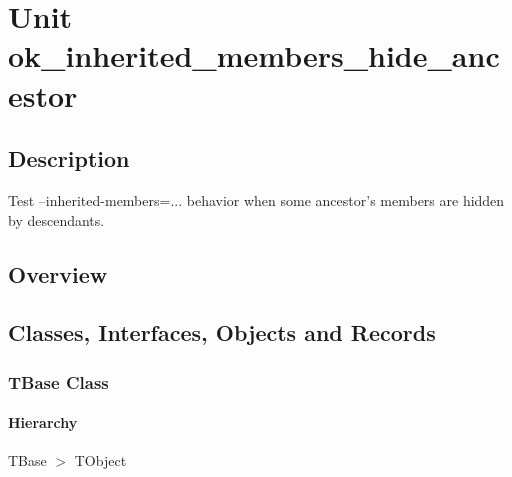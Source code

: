 \documentclass{report}
\newif\ifpdf
\begin{document}
\label{toc}\tableofcontents
\newpage
\newlength{\tmplength}
\chapter{Unit ok{\_}inherited{\_}members{\_}hide{\_}ancestor}
\label{ok_inherited_members_hide_ancestor}
\section{Description}
Test --inherited{-}members=... behavior when some ancestor's members are hidden by descendants.
\section{Overview}
\begin{description}
\item[\texttt{\begin{ttfamily}TBase\end{ttfamily} Class}]
\item[\texttt{\begin{ttfamily}TDerived\end{ttfamily} Class}]
\item[\texttt{\begin{ttfamily}TNewDerived\end{ttfamily} Class}]
\end{description}
\section{Classes, Interfaces, Objects and Records}
\ifpdf
\subsection*{\large{\textbf{TBase Class}}\normalsize\hspace{1ex}\hrulefill}
\else
\subsection*{TBase Class}
\fi
\label{ok_inherited_members_hide_ancestor.TBase}
\subsubsection*{\large{\textbf{Hierarchy}}\normalsize\hspace{1ex}\hfill}
TBase {$>$} TObject
\end{document}
